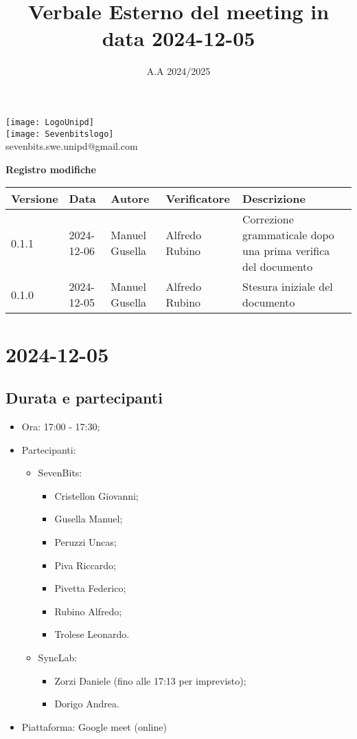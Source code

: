 \documentclass[12pt]{article}
\title{Verbale Esterno del meeting in data 2024-12-05}
\date{A.A 2024/2025}
\begin{document}
\maketitle
\begin{center}
\texttt{[image: LogoUnipd]}\\
\texttt{[image: Sevenbitslogo]}\\
sevenbits.swe.unipd@gmail.com\\
\vspace{2mm}

\textbf{Registro modifiche}\\
\vspace{2mm}
\begin{tabularx}{\textwidth}{|l|l|l|l|X|}
\hline
\textbf{Versione} & \textbf{Data} & \textbf{Autore} & \textbf{Verificatore} & \textbf{Descrizione} \\
\hline
0.1.1 & 2024-12-06 & Manuel Gusella & Alfredo Rubino & Correzione grammaticale dopo una prima verifica del documento\\
\hline
0.1.0 & 2024-12-05 & Manuel Gusella & Alfredo Rubino & Stesura iniziale del documento\\
\hline

\end{tabularx}
\end{center}
\newpage
\tableofcontents
\newpage
\section{2024-12-05}
\subsection{Durata e partecipanti}
\begin{itemize}
\item Ora: 17:00 - 17:30;
\item Partecipanti: 	
	\begin{itemize}
        \item SevenBits:
        \begin{itemize}
        		\item Cristellon Giovanni;
			\item Gusella Manuel;
			\item Peruzzi Uncas;
			\item Piva Riccardo;
			\item Pivetta Federico;
			\item Rubino Alfredo;
			\item Trolese Leonardo.
		\end{itemize}
		\item SyncLab:
		\begin{itemize}
			\item Zorzi Daniele (fino alle 17:13 per imprevisto);
			\item Dorigo Andrea.
		\end{itemize}
	\end{itemize}
\item Piattaforma: Google meet (online)
\end{itemize}
\end{document}
